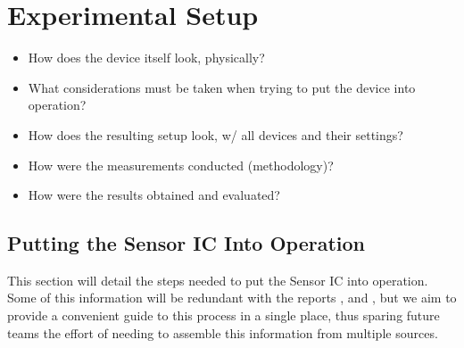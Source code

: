 \chapter{Experimental Setup}
\label{ch:experimentalSetup}

\begin{itemize}\tightlist
    \item
        How does the device itself look, physically?
    \item
        What considerations must  be taken when trying to put  the device into
        operation?
    \item
        How does the resulting setup look, w/ all devices and their settings?
    \item
        How were the measurements conducted (methodology)?
    \item
        How were the results obtained and evaluated?
\end{itemize}


\section{Putting the Sensor IC Into Operation}
\label{sec:ICintoOperation}

This  section  will  detail  the  steps  needed to  put  the  Sensor  IC  into
operation. Some  of  this  information  will be  redundant  with  the  reports
\cite{ref:burgherr},  \cite{ref:gloor} and  \cite{ref:baier},  but  we aim  to
provide a  convenient guide to  this process in  a single place,  thus sparing
future teams the effort of needing  to assemble this information from multiple
sources.
